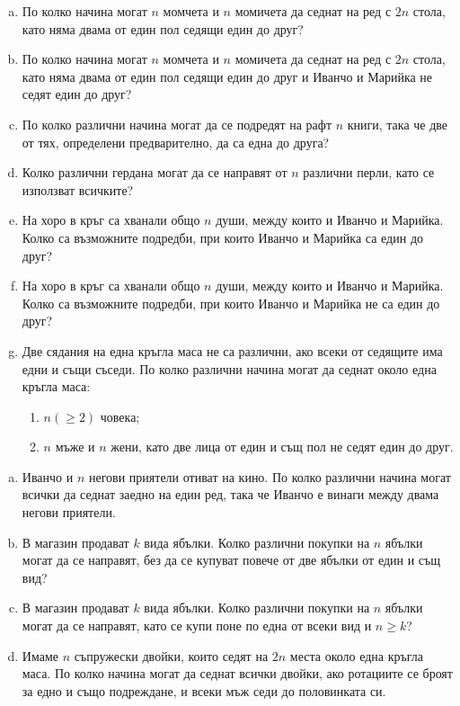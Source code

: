 \begin{problem}
  \begin{enumerate}[a)]
  \item
    По колко начина могат $n$ момчета и $n$ момичета да седнат на ред с $2n$ стола, като няма двама от един пол седящи един до друг?
  \item
    По колко начина могат $n$ момчета и $n$ момичета да седнат на ред с $2n$ стола, като няма двама от един пол седящи един до друг и Иванчо и Марийка не седят един до друг? 
  \item
    По колко различни начина могат да се подредят на рафт $n$ книги, така че две от тях, определени предварително, да са една до друга?
  \item
    Колко различни гердана могат да се направят от $n$ различни перли, като се използват всичките?
  \item
    На хоро в кръг са хванали общо $n$ души, между които и Иванчо и Марийка.
    Колко са възможните подредби, при които Иванчо и Марийка са един до друг?
 \item
    На хоро в кръг са хванали общо $n$ души, между които и Иванчо и Марийка.
    Колко са възможните подредби, при които Иванчо и Марийка не са един до друг?
  \item
    Две сядания на една кръгла маса не са различни, ако всеки от седящите има едни и същи съседи.
    По колко различни начина могат да седнат около една кръгла маса:
    \begin{enumerate}
    \item
      $n (\geq 2)$ човека;
    \item
      $n$ мъже и $n$ жени, като две лица от един и същ пол не седят един до друг.
    \end{enumerate}
  \end{enumerate}
\end{problem}


\begin{problem}
  \begin{enumerate}[a)]
  \item
    Иванчо и $n$ негови приятели отиват на кино.
    По колко различни начина могат всички да седнат заедно на един ред, така че Иванчо е винаги
    между двама негови приятели.
  \item
    В магазин продават $k$ вида ябълки.
    Колко различни покупки на $n$ ябълки могат да се направят, без да се купуват повече от две ябълки от един и същ вид?
  \item
    В магазин продават $k$ вида ябълки.
    Колко различни покупки на $n$ ябълки могат да се направят, като се купи поне по една от всеки вид и $n\geq k$?
  \item
    Имаме $n$ съпружески двойки, които седят на $2n$ места около една кръгла маса. 
    По колко начина могат да седнат всички двойки, ако ротациите се броят за едно и също подреждане, и
    всеки мъж седи до половинката си.
\end{enumerate}
\end{problem}



